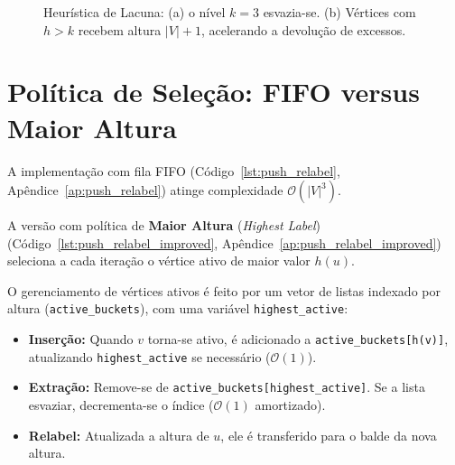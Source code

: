 \begin{figure}[!ht]
\centering
{}
\caption{Heurística de Lacuna: (a) o nível $k=3$ esvazia-se. (b) Vértices com $h > k$ recebem altura $|V|+1$, acelerando a devolução de excessos.}
\label{fig:gap_heuristica}
\end{figure}


\section{Política de Seleção: FIFO versus Maior Altura}

A implementação com fila FIFO (Código~\ref{lst:push_relabel}, Apêndice~\ref{ap:push_relabel}) atinge complexidade $\mathcal{O}(|V|^3)$.

A versão com política de \textbf{Maior Altura} (\textit{Highest Label}) (Código~\ref{lst:push_relabel_improved}, Apêndice~\ref{ap:push_relabel_improved}) seleciona a cada iteração o vértice ativo de maior valor $h(u)$.

O gerenciamento de vértices ativos é feito por um vetor de listas indexado por altura (\lstinline{active_buckets}), com uma variável \lstinline{highest_active}:
\begin{itemize}
    \item \textbf{Inserção:} Quando $v$ torna-se ativo, é adicionado a \lstinline{active_buckets[h(v)]}, atualizando \lstinline{highest_active} se necessário ($\mathcal{O}(1)$).
    \item \textbf{Extração:} Remove-se de \lstinline{active_buckets[highest_active]}. Se a lista esvaziar, decrementa-se o índice ($\mathcal{O}(1)$ amortizado).
    \item \textbf{Relabel:} Atualizada a altura de $u$, ele é transferido para o balde da nova altura.
\end{itemize}

